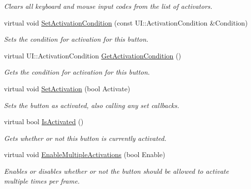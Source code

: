 \begin{DoxyCompactItemize}
\begin{DoxyCompactList}\small\item\em Clears all keyboard and mouse input codes from the list of activators. \item\end{DoxyCompactList}\item 
virtual void \hyperlink{classphys_1_1UI_1_1Button_a888cafb544472bbe3c5b023f4279030e}{SetActivationCondition} (const UI::ActivationCondition \&Condition)
\begin{DoxyCompactList}\small\item\em Sets the condition for activation for this button. \item\end{DoxyCompactList}\item 
virtual UI::ActivationCondition \hyperlink{classphys_1_1UI_1_1Button_a193f5fa1554d978a5061c08bd4eca86b}{GetActivationCondition} ()
\begin{DoxyCompactList}\small\item\em Gets the condition for activation for this button. \item\end{DoxyCompactList}\item 
virtual void \hyperlink{classphys_1_1UI_1_1Button_ae875686ae568fc121eef980b24949cc1}{SetActivation} (bool Activate)
\begin{DoxyCompactList}\small\item\em Sets the button as activated, also calling any set callbacks. \item\end{DoxyCompactList}\item 
virtual bool \hyperlink{classphys_1_1UI_1_1Button_ac54dde0e137f207bdec9a14b58063a6d}{IsActivated} ()
\begin{DoxyCompactList}\small\item\em Gets whether or not this button is currently activated. \item\end{DoxyCompactList}\item 
virtual void \hyperlink{classphys_1_1UI_1_1Button_a8524260064c118597de5c18175f56493}{EnableMultipleActivations} (bool Enable)
\begin{DoxyCompactList}\small\item\em Enables or disables whether or not the button should be allowed to activate multiple times per frame. \item\end{DoxyCompactList}\item 

\end{DoxyCompactItemize}
